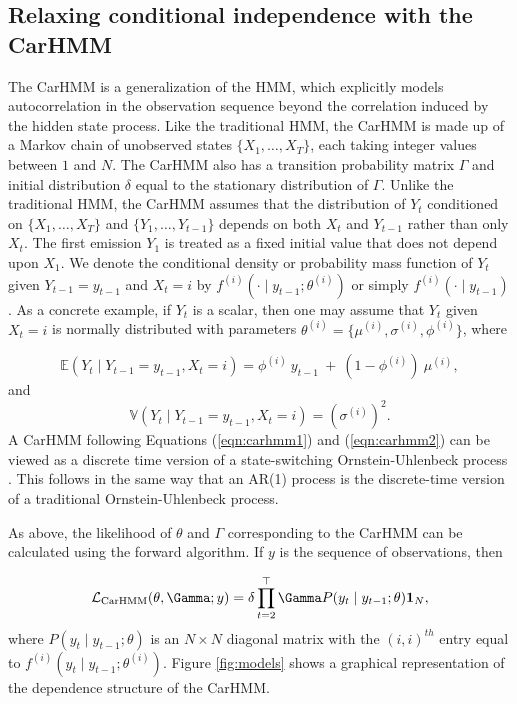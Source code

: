 \subsection{Relaxing conditional independence with the CarHMM}
\label{subsec:CarHMM}

The CarHMM \citep{Lawler:2019} is a generalization of the HMM, which explicitly models autocorrelation in the observation sequence beyond the correlation induced by the hidden state process. Like the traditional HMM, the CarHMM is made up of a Markov chain of unobserved states $\{X_1,\ldots,X_T\}$, each taking integer values between $1$ and $N$. The CarHMM also has a transition probability matrix $\Gamma$ and initial distribution $\delta$ equal to the stationary distribution of $\Gamma$. Unlike the traditional HMM, the CarHMM assumes that the distribution of $Y_t$ conditioned on $\{X_1,\ldots, X_T\}$ and $\{Y_1,\ldots, Y_{t-1}\}$ depends on both $X_t$ and $Y_{t-1}$ rather than only $X_t$. The first emission $Y_1$ is treated as a fixed initial value that does not depend upon $X_1$. We denote the conditional density or probability mass function of $Y_t$ given $Y_{t-1} = y_{t-1}$ and $X_t=i$ by $f^{(i)}(\cdot \mid y_{t-1}; \theta^{(i)})$ or simply $f^{(i)}(\cdot \mid y_{t-1})$. 
%
As a concrete example, if $Y_t$ is a scalar, then one may assume that $Y_t$ given $X_t = i$ is normally distributed with parameters $\theta^{(i)} = \{\mu^{(i)},\sigma^{(i)},\phi^{(i)}\}$, where

\begin{equation}
    \mathbb{E}(Y_{t} \mid Y_{t-1} = y_{t-1},X_t=i) = \phi^{(i)} ~ y_{t-1} ~+ ~(1-\phi^{(i)})  ~\mu^{(i)},
    \label{eqn:carhmm1}
\end{equation}
and
\begin{equation}
    \mathbb{V}(Y_t \mid Y_{t-1} = y_{t-1},X_t=i) = (\sigma^{(i)})^2.
    \label{eqn:carhmm2}
\end{equation}
%
A CarHMM following Equations (\ref{eqn:carhmm1}) and (\ref{eqn:carhmm2}) can be viewed as a discrete time version of a state-switching Ornstein-Uhlenbeck process \citep{Michelot:2019}. This follows in the same way that an AR(1) process is the discrete-time version of a traditional Ornstein-Uhlenbeck process. 

As above, the likelihood of $\theta$ and $\Gamma$ corresponding to the CarHMM can be calculated using the forward algorithm. If $y$ is the sequence of observations, then

\begin{equation*}
    \calL_{\text{CarHMM}}(\theta,\Gamma;y) = \delta \prod_{t=2}^\top \Gamma P(y_t \mid y_{t-1};\theta) \mathbf{1}_N,
    \label{eqn:CarHMM_likelihood}
\end{equation*}
where
%
$P(y_t \mid y_{t-1};\theta)$ is an $N \times N$ diagonal matrix with the $(i,i)^{th}$ entry equal to $f^{(i)}(y_t \mid y_{t-1}; \theta^{(i)})$. Figure \ref{fig:models} shows a graphical representation of the dependence structure of the CarHMM. 

